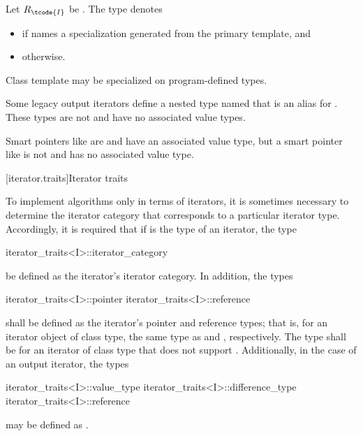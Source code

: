 %
\pnum
Let $R_\tcode{I}$ be .
The type  denotes
\begin{itemize}
\item
{}
if  names a specialization
generated from the primary template, and

\item
{} otherwise.
\end{itemize}

\pnum
Class template  may be specialized
on program-defined types.

\pnum
\begin{note}
Some legacy output iterators define a nested type named 
that is an alias for .
These types are not 
and have no associated value types.
\end{note}

\pnum
\begin{note}
Smart pointers like  are  and
have an associated value type, but a smart pointer like 
is not  and has no associated value type.
\end{note}

[iterator.traits]{Iterator traits}

\pnum
{}%
To implement algorithms only in terms of iterators, it is sometimes necessary to
determine the iterator category that corresponds to a particular iterator type.
Accordingly, it is required that if
is the type of an iterator,
the type
%
\begin{codeblock}
iterator_traits<I>::iterator_category
\end{codeblock}
be defined as the iterator's iterator category.
In addition, the types
%
%
\begin{codeblock}
iterator_traits<I>::pointer
iterator_traits<I>::reference
\end{codeblock}
shall be defined as the iterator's pointer and reference types;
that is, for an
iterator object  of class type,
the same type as
 and
,
respectively.
The type
shall be 
for an iterator of class type 
that does not support .
Additionally, in the case of an output iterator, the types
\begin{codeblock}
iterator_traits<I>::value_type
iterator_traits<I>::difference_type
iterator_traits<I>::reference
\end{codeblock}
may be defined as .

